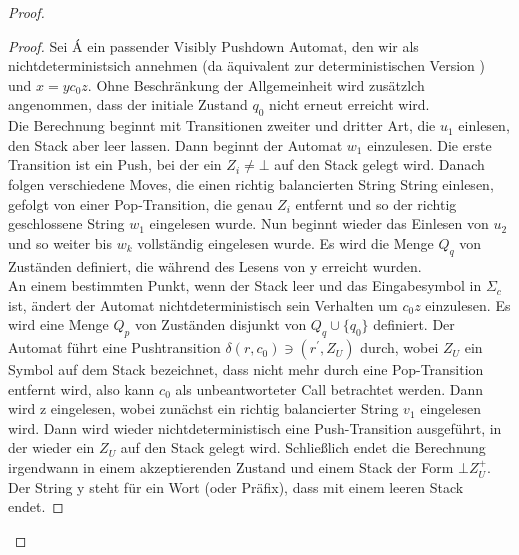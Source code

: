 \begin{proof}
\begin{proof}
Sei Á ein passender Visibly Pushdown Automat, den wir als nichtdeterministsich annehmen (da äquivalent zur deterministischen Version \cite{vpl}) und $x=yc_0z$. Ohne Beschränkung der Allgemeinheit wird zusätzlch angenommen, dass der initiale Zustand $q_0$ nicht erneut erreicht wird.\\
Die Berechnung beginnt mit Transitionen zweiter und dritter Art, die $u_1$ einlesen, den Stack aber leer lassen. Dann beginnt der Automat $w_1$ einzulesen. Die erste Transition ist ein Push, bei der ein $Z_i \neq \bot$ auf den Stack gelegt wird. Danach folgen verschiedene Moves, die einen richtig balancierten String String einlesen, gefolgt von einer Pop-Transition, die genau $Z_i$ entfernt und so der richtig geschlossene String $w_1$ eingelesen wurde. Nun beginnt wieder das Einlesen von $u_2$ und so weiter bis $w_k$ vollständig eingelesen wurde. Es wird die Menge $Q_q$ von Zuständen definiert, die während des Lesens von y erreicht wurden.\\
An einem bestimmten Punkt, wenn der Stack leer und das Eingabesymbol in $\Sigma_c$ ist, ändert der Automat nichtdeterministisch sein Verhalten um $c_0z$ einzulesen. Es wird eine Menge $Q_p$ von Zuständen disjunkt von $Q_q \cup \{q_0\}$ definiert. Der Automat führt eine Pushtransition $\delta(r, c_0) \ni (r^\prime, Z_U)$ durch, wobei $Z_U$ ein Symbol auf dem Stack bezeichnet, dass nicht mehr durch eine Pop-Transition entfernt wird, also kann $c_0$ als unbeantworteter Call betrachtet werden. Dann wird z eingelesen, wobei zunächst ein richtig balancierter String $v_1$ eingelesen wird. Dann wird wieder nichtdeterministisch eine Push-Transition ausgeführt, in der wieder ein $Z_U$ auf den Stack gelegt wird. Schließlich endet die Berechnung irgendwann in einem akzeptierenden Zustand und einem Stack der Form $\bot Z_U^+$. Der String y steht für ein Wort (oder Präfix), dass mit einem leeren Stack endet.
\end{proof}



\end{proof}
